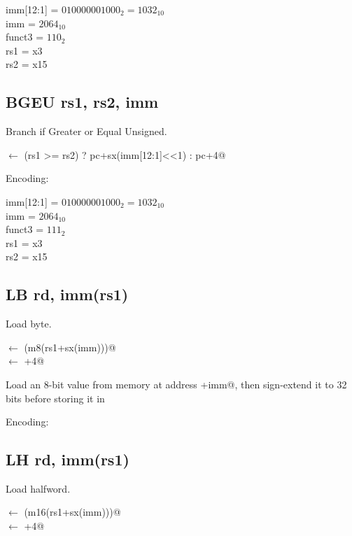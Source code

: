 imm[12:1] = $010000001000_2 = 1032_{10}$\\
imm = $2064_{10}$\\
funct3 = $110_2$\\
rs1 = x3\\
rs2 = x15


\subsection{BGEU rs1, rs2, imm}

Branch if Greater or Equal Unsigned.

\verb@pc@ $\leftarrow$ \verb@(rs1 >= rs2) ? pc+sx(imm[12:1]<<1) : pc+4@

Encoding:


imm[12:1] = $010000001000_2 = 1032_{10}$\\
imm = $2064_{10}$\\
funct3 = $111_2$\\
rs1 = x3\\
rs2 = x15

\subsection{LB rd, imm(rs1)}

Load byte.

\verb@rd@ $\leftarrow$ \verb@sx(m8(rs1+sx(imm)))@\\
\verb@pc@ $\leftarrow$ \verb@pc+4@

Load an 8-bit value from memory at address +imm@, then 
sign-extend it to 32 bits before storing it in \verb@rd@


Encoding:


\subsection{LH rd, imm(rs1)}

Load halfword.

\verb@rd@ $\leftarrow$ \verb@sx(m16(rs1+sx(imm)))@\\
\verb@pc@ $\leftarrow$ \verb@pc+4@

